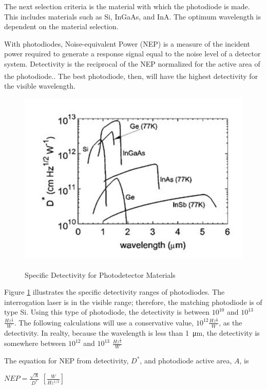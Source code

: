 \documentclass[letterpaper,10pt]{article}
\begin{document}
\begin{spacing}{1.15}
The next selection criteria is the material with which the photodiode is made. This includes materials such as Si, InGaAs, and InA. The optimum wavelength is dependent on the material selection.

With photodiodes, Noise-equivalent Power (NEP) is a measure of the incident power required to generate a response signal equal to the noise level of a detector system. Detectivity is the reciprocal of the NEP normalized for the active area of the photodiode.\textsuperscript{\cite{Microphotonics}}. The best photodiode, then, will have the highest detectivity for the visible wavelength.  

\begin{figure} [H]
	\centering
	\includegraphics[scale=0.4]{detectivity-table.png}
	\label{fig:detectivity-table}
	\caption{Specific Detectivity for Photodetector Materials \textsuperscript{\cite{Optical}} \label{fig:detectivity-table}}
\end{figure}

Figure \ref{fig:detectivity-table} illustrates the specific detectivity ranges of photodiodes. The interrogation laser is in the visible range; therefore, the matching photodiode is of type Si. Using this type of photodiode, the detectivity is between $10^{10}$ and $10^{13}$ $\frac{Hz^{\frac{1}{2}}}{W}$. The following calculations will use a conservative value, $10^{12} \frac{Hz^{\frac{1}{2}}}{W}$, as the detectivity. In realty, because the wavelength is less than \SI{1}{\micro\meter}, the detectivity is somewhere between $10^{12}$ and $10^{13}$ $\frac{Hz^{\frac{1}{2}}}{W}$

The equation for NEP from detectivity, $D^*$, and photodiode active area, $A$,  is 
\begin{center}
	{\large $NEP = \frac{\sqrt{A}}{D^*}$}  $[\frac{W}{Hz^{1/2}}]$
\end{center}


\end{spacing}
\end{document}

